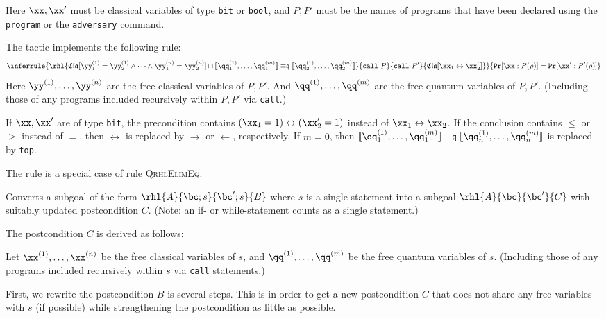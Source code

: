 \documentclass{article}
\renewcommand\ruleref[1]{rule \hbox{\textsc{#1}}}
\begin{document}
Here $\xx,\xx'$
must be classical variables of type \texttt{bit} or \texttt{bool}, and
$P,P'$
must be the names of programs that have been declared using the
\texttt{program} or the \texttt{adversary} command.

The tactic implements the following rule:
\[
\inferrule{
  \rhl{\mathfrak{Cla}[\yy^{(1)}_1=\yy^{(1)}_2\land\dots\land\yy^{(n)}_1=\yy^{(n)}_2]\sqcap
    \llbracket \qq_1^{(1)},\dots,\qq_1^{(m)} \rrbracket
    \mathrel{\mathord\equiv\mathfrak q}
    \llbracket \qq_2^{(1)},\dots,\qq_2^{(m)} \rrbracket}
  {\mathtt{call}\ P}{\mathtt{call}\ P'}
  {\mathfrak{Cla}[\xx_1\leftrightarrow\xx'_2]}
}
{
  \mathtt{Pr}[\xx:P(\rho)] =\mathtt{Pr}[\xx':P'(\rho)]
}
\]
Here $\yy^{(1)},\dots,\yy^{(n)}$
are the free classical variables of $P,P'$.
And $\qq^{(1)},\dots,\qq^{(m)}$
are the free quantum variables of $P,P'$.
(Including those of any programs included recursively within $P,P'$
via \texttt{call}.)

If $\xx,\xx'$
are of type \texttt{bit}, the precondition contains
$(\xx_1=1)\leftrightarrow(\xx'_2=1)$ instead of $\xx_1\leftrightarrow \xx_2$.
If the conclusion contains $\leq$
or $\geq$
instead of $=$,
then $\leftrightarrow$
is replaced by $\rightarrow$
or $\leftarrow$,
respectively.  If $m=0$,
then
$\llbracket \qq_1^{(1)},\dots,\qq_1^{(m)} \rrbracket
\mathrel{\mathord\equiv\mathfrak q} \llbracket
\qq_n^{(1)},\dots,\qq_n^{(m)} \rrbracket$ is replaced by \texttt{top}.

The rule is a special case of \ruleref{QrhlElimEq}.






Converts a subgoal of the form
$\rhl{A}{\bc;s}{\bc';s}{B}$
where $s$ is a single statement
into a subgoal $\rhl{A}{\bc}{\bc'}{C}$
with suitably updated postcondition $C$.
(Note: an if- or while-statement counts as a single statement.)

The postcondition $C$ is derived as follows:

Let $\xx^{(1)},\dots,\xx^{(n)}$
be the free classical variables of $s$,
and $\qq^{(1)},\dots,\qq^{(m)}$
be the free quantum variables of $s$.
(Including those of any programs included recursively within $s$
via \texttt{call} statements.)

First, we rewrite the postcondition $B$
is several steps. This is in order to get a new postcondition $C$ that does
not share any free variables with $s$ (if possible) while strengthening the postcondition as little as
possible.
\end{document}
